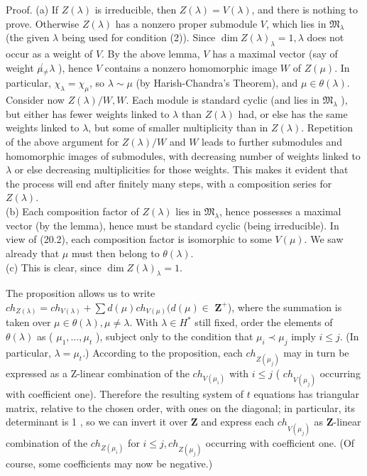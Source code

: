 \documentclass[10pt]{article}
\begin{document}
Proof. (a) If $Z(\lambda)$ is irreducible, then $Z(\lambda)=V(\lambda)$, and there is nothing to prove. Otherwise $Z(\lambda)$ has a nonzero proper submodule $V$, which lies in $\mathfrak{M}_{\lambda}$ (the given $\lambda$ being used for condition (2)). Since $\operatorname{dim} Z(\lambda)_{\lambda}=1, \lambda$ does not occur as a weight of $V$. By the above lemma, $V$ has a maximal vector (say of weight $\mu \not{ }_{\neq} \lambda$ ), hence $V$ contains a nonzero homomorphic image $W$ of $Z(\mu)$. In particular, $\chi_{\lambda}=\chi_{\mu}$, so $\lambda \sim \mu$ (by Harish-Chandra's Theorem), and $\mu \in \theta(\lambda)$. Consider now $Z(\lambda) / W, W$. Each module is standard cyclic (and lies in $\mathfrak{M}_{\lambda}$ ), but either has fewer weights linked to $\lambda$ than $Z(\lambda)$ had, or else has the same weights linked to $\lambda$, but some of smaller multiplicity than in $Z(\lambda)$. Repetition of the above argument for $Z(\lambda) / W$ and $W$ leads to further submodules and homomorphic images of submodules, with decreasing number of weights linked to $\lambda$ or else decreasing multiplicities for those weights. This makes it evident that the process will end after finitely many steps, with a composition series for $Z(\lambda)$.\\
(b) Each composition factor of $Z(\lambda)$ lies in $\mathfrak{M}_{\lambda}$, hence possesses a maximal vector (by the lemma), hence must be standard cyclic (being irreducible). In\\
view of (20.2), each composition factor is isomorphic to some $V(\mu)$. We saw already that $\mu$ must then belong to $\theta(\lambda)$.\\
(c) This is clear, since $\operatorname{dim} Z(\lambda)_{\lambda}=1$.

The proposition allows us to write $c h_{Z(\lambda)}=c h_{V(\lambda)}+\sum d(\mu) c h_{V(\mu)}(d(\mu) \in$ $\mathbf{Z}^{+}$), where the summation is taken over $\mu \in \theta(\lambda), \mu \neq \lambda$. With $\lambda \in H^{*}$ still fixed, order the elements of $\theta(\lambda)$ as ( $\mu_{1}, \ldots, \mu_{t}$ ), subject only to the condition that $\mu_{i} \prec \mu_{j}$ imply $i \leq j$. (In particular, $\lambda=\mu_{t}$.) According to the proposition, each $c h_{Z\left(\mu_{j}\right)}$ may in turn be expressed as a Z-linear combination of the $c h_{V\left(\mu_{i}\right)}$ with $i \leq j$ ( $c h_{V\left(\mu_{j}\right)}$ occurring with coefficient one). Therefore the resulting system of $t$ equations has triangular matrix, relative to the chosen order, with ones on the diagonal; in particular, its determinant is 1 , so we can invert it over $\mathbf{Z}$ and express each $c h_{V\left(\mu_{j}\right)}$ as $\mathbf{Z}$-linear combination of the $c h_{Z\left(\mu_{i}\right)}$ for $i \leq j, c h_{Z\left(\mu_{j}\right)}$ occurring with coefficient one. (Of course, some coefficients may now be negative.)
\end{document}
